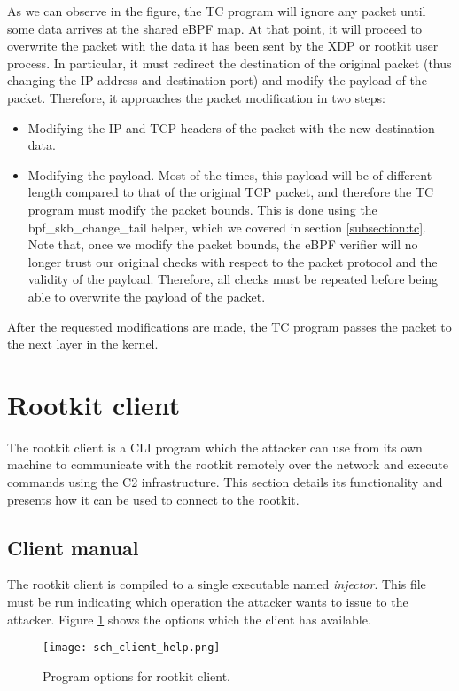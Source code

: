 As we can observe in the figure, the TC program will ignore any packet until some data arrives at the shared eBPF map. At that point, it will proceed to overwrite the packet with the data it has been sent by the XDP or rootkit user process. In particular, it must redirect the destination of the original packet (thus changing the IP address and destination port) and modify the payload of the packet. Therefore, it approaches the packet modification in two steps:
\begin{itemize}
\item Modifying the IP and TCP headers of the packet with the new destination data.
\item Modifying the payload. Most of the times, this payload will be of different length compared to that of the original TCP packet, and therefore the TC program must modify the packet bounds. This is done using the bpf\_skb\_change\_tail helper, which we covered in section \ref{subsection:tc}. Note that, once we modify the packet bounds, the eBPF verifier will no longer trust our original checks with respect to the packet protocol and the validity of the payload. Therefore, all checks must be repeated before being able to overwrite the payload of the packet.
\end{itemize}

After the requested modifications are made, the TC program passes the packet to the next layer in the kernel.



\section{Rootkit client}
The rootkit client is a CLI program which the attacker can use from its own machine to communicate with the rootkit remotely over the network and execute commands using the C2 infrastructure. This section details its functionality and presents how it can be used to connect to the rootkit.

\subsection{Client manual} \label{subsection:rootkit_manual}
The rootkit client is compiled to a single executable named \textit{injector}. This file must be run indicating which operation the attacker wants to issue to the attacker. Figure \ref{fig:client_help} shows the options which the client has available.

\begin{figure}[htbp]
	\centering
	\texttt{[image: sch\_client\_help.png]}
	\caption{Program options for rootkit client.}
	\label{fig:client_help}
\end{figure}

